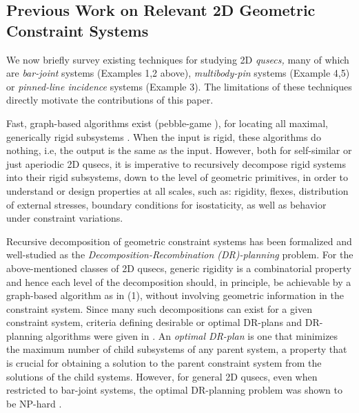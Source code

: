 \subsection{Previous Work on Relevant 2D Geometric Constraint Systems}
We now briefly survey existing techniques for studying 2D {\em qusecs,}  many of which are
{\it bar-joint} systems (Examples 1,2 above), {\it multibody-pin} systems (Example 4,5) or {\it pinned-line incidence} systems (Example 3). 
The limitations of these techniques directly motivate the contributions of this paper.

\medskip\noindent{}
Fast, graph-based algorithms exist (pebble-game \cite{XX}),   
for locating all maximal, generically rigid subsystems \cite{XX}. 
When the input is rigid, these algorithms do nothing, i.e, the output is the same as the input.
However, both for self-similar or just aperiodic 2D qusecs, it is imperative to recursively decompose rigid systems 
into their rigid subsystems, down to the level of geometric primitives, in order to 
understand or design properties at all scales, such as: rigidity, flexes, distribution 
of external stresses, boundary conditions for isostaticity, as well as behavior under constraint variations.
 
\medskip\noindent{}
Recursive decomposition of geometric constraint systems has been formalized \cite{XX} and well-studied \cite{XX} 
as the {\sl Decomposition-Recombination (DR)-planning} problem.
For the above-mentioned classes of 2D qusecs, generic rigidity is 
a combinatorial property and hence each level of the decomposition should, in principle, be achievable by a graph-based algorithm as in (1), without
involving geometric information in the constraint system.  
Since many  such decompositions can exist for a given constraint system, 
criteria defining desirable or optimal DR-plans and DR-planning algorithms were given in \cite{XX}. An {\em optimal DR-plan} is one
that minimizes the maximum number of child subsystems of any parent system, a property that is 
crucial for obtaining a solution to the parent constraint system from the solutions of the child systems.
However, for general 2D qusecs, even when restricted to bar-joint systems, 
the optimal DR-planning problem was shown to be NP-hard \cite{XX}.

